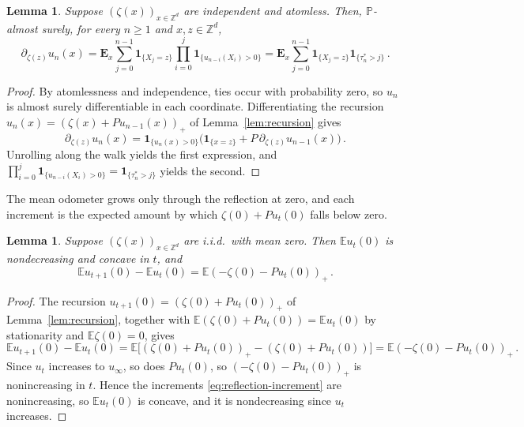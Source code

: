 \documentclass[11pt]{amsart}
\theoremstyle{plain}
\newtheorem{lemma}[theorem]{Lemma}
\theoremstyle{definition}
\newcommand{\Z}{\mathbb{Z}}
\newcommand{\E}{\mathbb{E}}
\renewcommand{\P}{\mathbb{P}}
\newcommand{\one}{\mathbf{1}}
\begin{document}
\begin{lemma}\label{lem:odometer-derivative}
	Suppose $(\zeta(x))_{x\in\Z^d}$ are independent and atomless. Then,
	$\P$-almost surely, for every $n\geq1$ and $x,z\in\Z^d$,
	\begin{equation}\label{eq:odometer-derivative}
		\partial_{\zeta(z)}u_n(x)
		=
		\mathbf E_x\sum_{j=0}^{n-1}
		\one_{\{X_j=z\}}
		\prod_{i=0}^j\one_{\{u_{n-i}(X_i)>0\}}
		=
		\mathbf E_x\sum_{j=0}^{n-1}
		\one_{\{X_j=z\}}\one_{\{\tau_n^*>j\}}\, .
	\end{equation}
\end{lemma}
\begin{proof}
	By atomlessness and independence, ties occur with probability zero, so $u_n$
	is almost surely differentiable in each coordinate. Differentiating the recursion
	$u_n(x)=(\zeta(x)+Pu_{n-1}(x))_+$ of Lemma~\ref{lem:recursion} gives
	\[
		\partial_{\zeta(z)}u_n(x)
		=\one_{\{u_n(x)>0\}}
		\bigl(\one_{\{x=z\}}+P\,\partial_{\zeta(z)}u_{n-1}(x)\bigr)\, .
	\]
	Unrolling along the walk yields the first expression, and
	$\prod_{i=0}^j\one_{\{u_{n-i}(X_i)>0\}}=\one_{\{\tau_n^*>j\}}$ yields the
	second.
\end{proof}

	The mean odometer grows only through the reflection at zero, and each
	increment is the expected amount by which $\zeta(0)+Pu_t(0)$ falls below zero.

\begin{lemma}\label{lem:reflection-increment}
	Suppose $(\zeta(x))_{x\in\Z^d}$ are i.i.d.\ with mean zero. Then $\E u_t(0)$
	is nondecreasing and concave in $t$, and
	\begin{equation}\label{eq:reflection-increment}
		\E u_{t+1}(0)-\E u_t(0)=\E(-\zeta(0)-Pu_t(0))_+\, .
	\end{equation}
\end{lemma}
\begin{proof}
	The recursion $u_{t+1}(0)=(\zeta(0)+Pu_t(0))_+$ of
	Lemma~\ref{lem:recursion}, together with $\E(\zeta(0)+Pu_t(0))=\E u_t(0)$ by
	stationarity and $\E\zeta(0)=0$, gives
	\[
		\E u_{t+1}(0)-\E u_t(0)
		=\E\bigl[(\zeta(0)+Pu_t(0))_+-(\zeta(0)+Pu_t(0))\bigr]
		=\E(-\zeta(0)-Pu_t(0))_+\, .
	\]
	Since $u_t$ increases to $u_\infty$, so does $Pu_t(0)$, so
	$(-\zeta(0)-Pu_t(0))_+$ is nonincreasing in $t$. Hence the increments
	\eqref{eq:reflection-increment} are nonincreasing, so $\E u_t(0)$ is concave,
	and it is nondecreasing since $u_t$ increases.
\end{proof}
\end{document}
